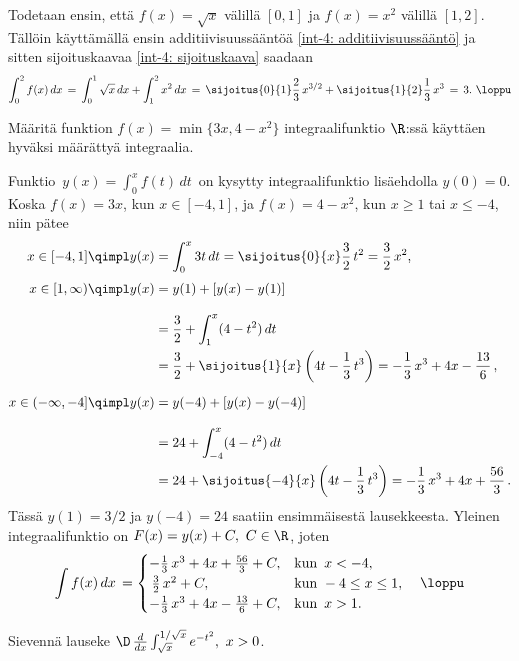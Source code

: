 \ratk Todetaan ensin, että $f(x)=\sqrt{x}$ välillä $[0,1]$ ja $f(x)=x^2$ välillä $[1,2]$.
Tällöin käyttämällä ensin additiivisuussääntöä \eqref{int-4: additiivisuussääntö} ja sitten
sijoituskaavaa \eqref{int-4: sijoituskaava} saadaan
\[
\int_0^2 f(x)\,dx \,=\, \int_0^1 \sqrt{x}\,dx + \int_1^2 x^2\,dx
                  \,=\, \sijoitus{0}{1}\frac{2}{3}\,x^{3/2}+\sijoitus{1}{2}\frac{1}{3}\,x^3
                  \,=\, 3. \ \loppu
\]
\begin{Exa} Määritä funktion $f(x)=\min\{3x,4-x^2\}$ integraalifunktio $\R$:ssä käyttäen
hyväksi määrättyä integraalia. \end{Exa}
\ratk Funktio $\,y(x)=\int_0^x f(t)\,dt\,$ on kysytty integraalifunktio lisäehdolla $y(0)=0$.
Koska $f(x)=3x$, kun $x\in[-4,1]$, ja $f(x)=4-x^2$, kun $x \ge 1$ tai $x \le -4$, niin pätee
\begin{align*}
x\in[-4,1]       \qimpl y(x) &= \int_0^x 3t\,dt = \sijoitus{0}{x}\frac{3}{2}\,t^2 
                              = \frac{3}{2}\,x^2, \\[1mm]
x\in[1,\infty)   \qimpl y(x) &= y(1)+[y(x)-y(1)] \\[3mm]
                             &= \frac{3}{2}+\int_1^x (4-t^2)\,dt \\
                             &= \frac{3}{2}+\sijoitus{1}{x}\left(4t-\frac{1}{3}\,t^3\right)
                              = -\frac{1}{3}\,x^3 + 4x -\frac{13}{6}\,, \\[2mm]
x\in(-\infty,-4] \qimpl y(x) &= y(-4)+[y(x)-y(-4)] \\[3mm]
                             &= 24+\int_{-4}^x (4-t^2)\,dt \\
                             &= 24+\sijoitus{-4}{x}\left(4t-\frac{1}{3}\,t^3\right)
                              = -\frac{1}{3}\,x^3 + 4x +\frac{56}{3}\,.
\end{align*}
Tässä $y(1)=3/2$ ja $y(-4)=24$ saatiin ensimmäisestä lausekkeesta. Yleinen integraalifunktio
on $F(x)=y(x)+C,\ C\in\R$, joten
\[
\int f(x)\,dx\,= \begin{cases}
                  -\frac{1}{3}\,x^3 + 4x +\frac{56}{3}+C,  &\text{kun}\,\ x < -4, \\
                 \,\frac{3}{2}\,x^2+C,                     &\text{kun}\ -4 \le x \le 1, \\
                  -\frac{1}{3}\,x^3 + 4x -\frac{13}{6}+C,  &\text{kun}\,\ x>1.
                \end{cases} \quad\loppu
\]
\begin{Exa} Sievennä lauseke $\D \,\frac{d}{dx}\int_{\sqrt{x}}^{1/\sqrt{x}}e^{-t^2},\ x>0$.
\end{Exa}
